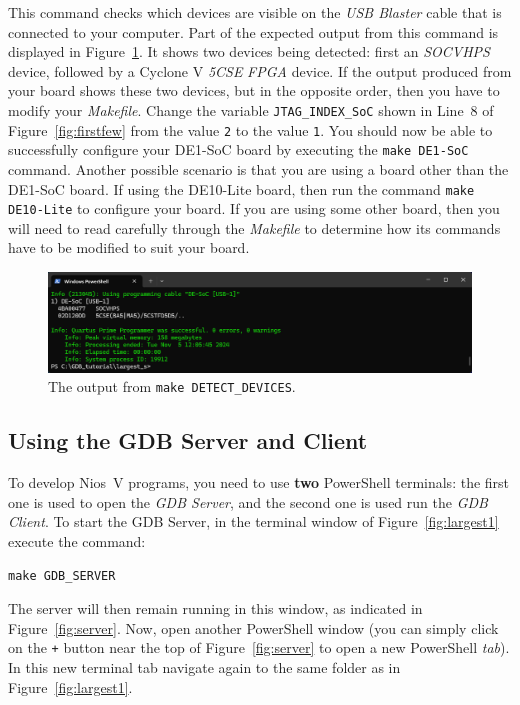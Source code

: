 \documentclass[11pt, twoside, pdftex]{article}
\begin{document}
{This command checks which devices are visible on the {\it USB Blaster} cable that is connected to
your computer. Part of the expected output from this command is displayed in
Figure~\ref{fig:detect}. It shows 
two devices being detected: first an {\it SOCVHPS} device, followed by a Cyclone V {\it 5CSE} 
{\it FPGA} device.  If the output produced from your board shows these two devices, but in the 
opposite order, then you have to modify your {\it Makefile}.
Change the variable \texttt{JTAG\_INDEX\_SoC} shown in Line~8 of 
Figure~\ref{fig:firstfew} from the value \texttt{2} to the value \texttt{1}. You should now 
be able to successfully configure your DE1-SoC board by executing the \texttt{make DE1-SoC}
command. Another possible scenario is that you are using a board other 
than the DE1-SoC board. If using the DE10-Lite board, then run the 
command \texttt{make DE10-Lite} to configure your board. If you are using some other board, 
then you will need to read carefully through the {\it Makefile} to determine how its
commands have to be modified to suit your board. 

\begin{figure}[h]
    \begin{center}
        \includegraphics[scale=.55]{figures/detect.png}
        \caption{The output from \texttt{make DETECT\_DEVICES}.}
        \label{fig:detect}
    \end{center}
\end{figure}

\subsection{Using the GDB Server and Client}
\label{sec:doit}

To develop Nios~V programs, you need to use {\bf two} PowerShell terminals: the first one
is used to open the {\it GDB Server}, and the second one is used run the {\it GDB Client}. 
To start the GDB Server, in the terminal window of Figure~\ref{fig:largest1} execute the command:

\texttt{make GDB\_SERVER}

The server will then remain running in this window, as indicated in Figure~\ref{fig:server}. 
Now, open another PowerShell window (you can simply click on the \texttt{+} button near the 
top of Figure~\ref{fig:server} to open a new PowerShell {\it tab}). In this new terminal 
tab navigate again to the same folder as in Figure~\ref{fig:largest1}. 

}
\end{document}
